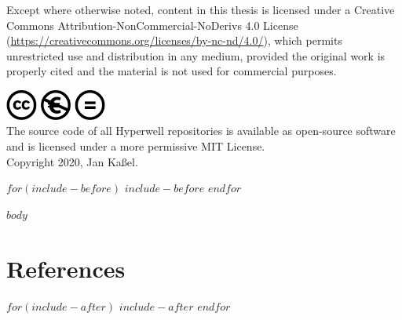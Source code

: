 \documentclass[11pt,a4paper]{book}
\begin{document}

Except where otherwise noted, content in this thesis is licensed under a Creative Commons Attribution-NonCommercial-NoDerivs 4.0 License (\url{https://creativecommons.org/licenses/by-nc-nd/4.0/}), which permits unrestricted use and distribution in any medium, provided the original work is properly cited and the material is not used for commercial purposes.

\vspace{2mm}
\includegraphics[width=0.25\textwidth]{layout/cc-nc-nd.pdf} \\

The source code of all Hyperwell repositories is available as open-source software and is licensed under a more permissive MIT License. \\

Copyright 2020, Jan Kaßel.


\pagebreak

\tableofcontents
\newpage

$for(include-before)$
  $include-before$
$endfor$

$body$

{
  \footnotesize
  \chapter{References}
  \printbibliography
}
\newpage

$for(include-after)$
  $include-after$
$endfor$
\end{document}
